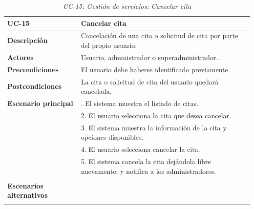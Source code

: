 \begin{table}
  \begin{center}
    \begin{tabularx}{16.4cm}{|l|X|}
      \hline
      \textbf{UC-15} & \textbf{Cancelar cita}\\
      \hline
      \textbf{Descripción} & Cancelación de una cita o solicitud de cita por parte del propio usuario. \\
      \hline
      \textbf{Actores} & Usuario, administrador o superadministrador..\\
      \hline
      \textbf{Precondiciones} & El usuario debe haberse identificado previamente.\\
      \hline
      \textbf{Postcondiciones} & La cita o solicitud de cita del usuario quedará cancelada.\\
      \hline
      \textbf{Escenario principal} & \smallskip 1. El sistema muestra el listado de citas.\\
      & 2. El usuario selecciona la cita que desea cancelar.\\
      & 3. El sistema muestra la información de la cita y opciones disponibles.\\
      & 4. El usuario selecciona cancelar la cita.\\
      & 5. El sistema cancela la cita dejándola libre nuevamente, y notifica a los administradores.\\
      & \\
      \hline
      \textbf{Escenarios alternativos} & \\
      & \\
      \hline
    \end{tabularx}
    \caption{\textit{UC-15: Gestión de servicios: Cancelar cita}}
    \label{tab:CU-cancelar-cita}
  \end{center}
\end{table}


